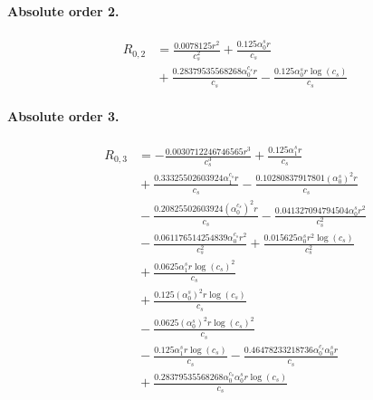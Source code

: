 \documentclass[10pt]{article}
\begin{document}
\paragraph{Absolute order 2.}
\begin{align*}
R_{0,2} &= \frac{0.0078125 r^{2}}{c_{s}^{2}} + \frac{0.125 \alpha_{0}^s r}{c_{s}} \\
&{}  + \frac{0.28379535568268 \alpha_{0}^{c_s} r}{c_{s}} - \frac{0.125 \alpha_{0}^s r \log{\left(c_{s} \right)}}{c_{s}}
\end{align*}

\paragraph{Absolute order 3.}
\begin{align*}
R_{0,3} &=  - \frac{0.0030712246746565 r^{3}}{c_{s}^{3}} + \frac{0.125 \alpha_{1}^s r}{c_{s}} \\
&{}  + \frac{0.33325502603924 \alpha_{1}^{c_s} r}{c_{s}} - \frac{0.10280837917801 \left(\alpha_{0}^s\right)^{2} r}{c_{s}} \\
&{}  - \frac{0.20825502603924 \left(\alpha_{0}^{c_s}\right)^{2} r}{c_{s}} - \frac{0.041327094794504 \alpha_{0}^s r^{2}}{c_{s}^{2}} \\
&{}  - \frac{0.061176514254839 \alpha_{0}^{c_s} r^{2}}{c_{s}^{2}} + \frac{0.015625 \alpha_{0}^s r^{2} \log{\left(c_{s} \right)}}{c_{s}^{2}} \\
&{}  + \frac{0.0625 \alpha_{1}^s r \log{\left(c_{s} \right)}^{2}}{c_{s}} \\
&{}  + \frac{0.125 \left(\alpha_{0}^s\right)^{2} r \log{\left(c_{s} \right)}}{c_{s}} \\
&{}  - \frac{0.0625 \left(\alpha_{0}^s\right)^{2} r \log{\left(c_{s} \right)}^{2}}{c_{s}} \\
&{}  - \frac{0.125 \alpha_{1}^s r \log{\left(c_{s} \right)}}{c_{s}} - \frac{0.46478233218736 \alpha_{0}^{c_s} \alpha_{0}^s r}{c_{s}} \\
&{}  + \frac{0.28379535568268 \alpha_{0}^{c_s} \alpha_{0}^s r \log{\left(c_{s} \right)}}{c_{s}}
\end{align*}
\end{document}
